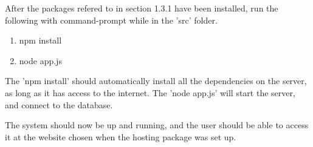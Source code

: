 After the packages refered to in section 1.3.1 have been installed, run the following with command-prompt while in the 'src' folder. 
\begin{enumerate} 
\item npm install 
\item node app.js 
\end{enumerate}

The 'npm install' should automatically install all the dependencies on the server, as long as it has access to the internet.
The 'node app.js' will start the server, and connect to the database.

The system should now be up and running, and the user should be able to access it at the website chosen when the hosting package was set up.
